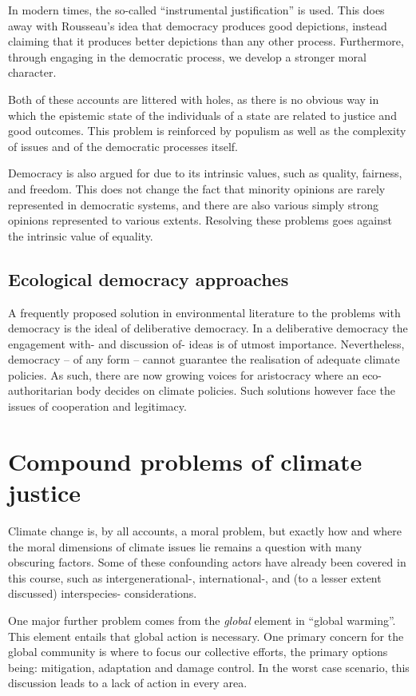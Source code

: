 \documentclass[12pt]{report}
\begin{document}
In modern times, the so-called ``instrumental justification'' is used. This does
away with Rousseau's idea that democracy produces good depictions, instead
claiming that it produces better depictions than any other process. Furthermore,
through engaging in the democratic process, we develop a stronger moral
character.

Both of these accounts are littered with holes, as there is no obvious way in
which the epistemic state of the individuals of a state are related to justice
and good outcomes. This problem is reinforced by populism as well as the
complexity of issues and of the democratic processes itself. 

Democracy is also argued for due to its intrinsic values, such as quality,
fairness, and freedom. This does not change the fact that minority opinions are
rarely represented in democratic systems, and there are also various simply
strong opinions represented to various extents. Resolving these problems goes
against the intrinsic value of equality.


\section{Ecological democracy approaches}

A frequently proposed solution in environmental literature to the problems with
democracy is the ideal of deliberative democracy. In a deliberative democracy
the engagement with- and discussion of- ideas is of utmost importance.
Nevertheless, democracy -- of any form -- cannot guarantee the realisation of
adequate climate policies. As such, there are now growing voices for aristocracy
where an eco-authoritarian body decides on climate policies. Such solutions
however face the issues of cooperation and legitimacy.

\chapter{Compound problems of climate justice}

Climate change is, by all accounts, a moral problem, but exactly how and where
the moral dimensions of climate issues lie remains a question with many
obscuring factors. Some of these confounding actors have already been covered in
this course, such as intergenerational-, international-, and (to a lesser extent
discussed) interspecies- considerations.

One major further problem comes from the \emph{global} element in ``global
warming''. This element entails that global action is necessary. One primary
concern for the global community is where to focus our collective efforts, the
primary options being: mitigation, adaptation and damage control. In the worst
case scenario, this discussion leads to a lack of action in every area.
\end{document}
